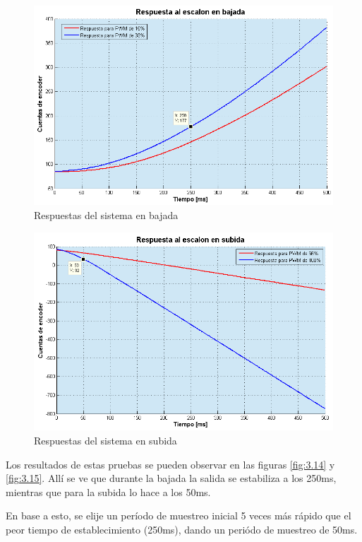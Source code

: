 \begin{figure}[!ht]
	\centering
	\includegraphics[width=15cm,scale=1]{resources/3_14-respuestaEnBajada.png}
	\caption{Respuestas del sistema en bajada}
	\label{fig:\thefigure}
\end{figure}

\begin{figure}[!ht]
	\centering
	\includegraphics[width=15cm,scale=1]{resources/3_15-respuestaEnSubida.png}
	\caption{Respuestas del sistema en subida}
	\label{fig:\thefigure}
\end{figure}

Los resultados de estas pruebas se pueden observar en las figuras \ref{fig:3.14} y \ref{fig:3.15}. Allí se ve que durante la bajada la salida se estabiliza a los 250ms, mientras que para la subida lo hace a los 50ms. 

En base a esto, se elije un período de muestreo inicial 5 veces más rápido que el peor tiempo de establecimiento (250ms), dando un periódo de muestreo de 50ms.

